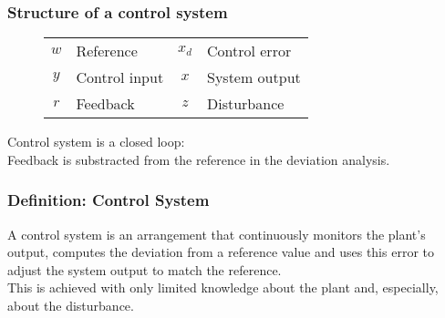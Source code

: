 \subsubsection{Structure of a control system}%
\label{dls:ssub:structure_of_a_control_system}
\begin{figure}[!h]
  \centering
  \vspace{2em}

  \begin{tabular}{clcl}
    \(w\) & Reference & \(x_d\) & Control error\\
    \(y\) & Control input & \(x\) & System output\\
    \(r\) & Feedback & \(z\) & Disturbance\\
  \end{tabular}
\end{figure}

Control system is a closed loop:\\
Feedback is substracted from the reference in the deviation analysis.

\subsubsection{Definition: Control System}%
\label{dls:ssub:definition_control_system}
A control system is an arrangement that continuously monitors the plant's output, computes
the deviation from a reference value and uses this error to adjust the system output to match the reference.\\
This is achieved with only limited knowledge about the plant and, especially, about the disturbance.

